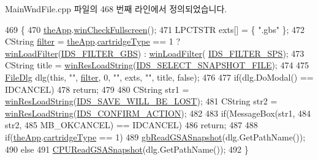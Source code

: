 Main\+Wnd\+File.\+cpp 파일의 468 번째 라인에서 정의되었습니다.


\begin{DoxyCode}
469 \{
470   \mbox{\hyperlink{_v_b_a_8cpp_a8095a9d06b37a7efe3723f3218ad8fb3}{theApp}}.\mbox{\hyperlink{class_v_b_a_a340eaeeb7fcfc242f08ac3442d991a96}{winCheckFullscreen}}();
471   LPCTSTR exts[] = \{ \textcolor{stringliteral}{".gbs"} \};
472   CString \mbox{\hyperlink{_s_d_l_8cpp_af0122ee4312107103b580a98c74a4ea6}{filter}} = \mbox{\hyperlink{_v_b_a_8cpp_a8095a9d06b37a7efe3723f3218ad8fb3}{theApp}}.\mbox{\hyperlink{class_v_b_a_af300759fcbc7eeb00ce73f956fc5ddb7}{cartridgeType}} == 1 ? 
      \mbox{\hyperlink{class_main_wnd_a7adc4aa2a10246fa13637e9d0870843d}{winLoadFilter}}(\mbox{\hyperlink{resource_8h_a55b32dff42e3aa47654c3f5197e11814}{IDS\_FILTER\_GBS}}) : \mbox{\hyperlink{class_main_wnd_a7adc4aa2a10246fa13637e9d0870843d}{winLoadFilter}}(
      \mbox{\hyperlink{resource_8h_a3509f1fb918cd687df0a40b31ea330fd}{IDS\_FILTER\_SPS}});
473   CString title = \mbox{\hyperlink{_win_res_util_8cpp_a416e85e80ab9b01376e87251c83d1a5a}{winResLoadString}}(\mbox{\hyperlink{resource_8h_ab4ce5e1027b17dec2f22647016aaa9fd}{IDS\_SELECT\_SNAPSHOT\_FILE}});
474 
475   \mbox{\hyperlink{class_file_dlg}{FileDlg}} dlg(\textcolor{keyword}{this}, \textcolor{stringliteral}{""}, \mbox{\hyperlink{_s_d_l_8cpp_af0122ee4312107103b580a98c74a4ea6}{filter}}, 0, \textcolor{stringliteral}{""}, exts, \textcolor{stringliteral}{""}, title, \textcolor{keyword}{false});
476   
477   \textcolor{keywordflow}{if}(dlg.DoModal() == IDCANCEL)
478     \textcolor{keywordflow}{return};
479 
480   CString str1 = \mbox{\hyperlink{_win_res_util_8cpp_a416e85e80ab9b01376e87251c83d1a5a}{winResLoadString}}(\mbox{\hyperlink{resource_8h_ac8fdd50f35135296f6c7d45a91751832}{IDS\_SAVE\_WILL\_BE\_LOST}});
481   CString str2 = \mbox{\hyperlink{_win_res_util_8cpp_a416e85e80ab9b01376e87251c83d1a5a}{winResLoadString}}(\mbox{\hyperlink{resource_8h_abc0b84029b8a14e65133a98d2b691eeb}{IDS\_CONFIRM\_ACTION}});
482 
483   \textcolor{keywordflow}{if}(MessageBox(str1,
484                 str2,
485                 MB\_OKCANCEL) == IDCANCEL)
486     \textcolor{keywordflow}{return};
487 
488   \textcolor{keywordflow}{if}(\mbox{\hyperlink{_v_b_a_8cpp_a8095a9d06b37a7efe3723f3218ad8fb3}{theApp}}.\mbox{\hyperlink{class_v_b_a_af300759fcbc7eeb00ce73f956fc5ddb7}{cartridgeType}} == 1)
489     \mbox{\hyperlink{_g_b_8cpp_aafea78cba80f883ee6f48e9fad826491}{gbReadGSASnapshot}}(dlg.GetPathName());
490   \textcolor{keywordflow}{else}
491     \mbox{\hyperlink{_g_b_a_8cpp_a25e768ca91f66c5d88ffe14f57a31caa}{CPUReadGSASnapshot}}(dlg.GetPathName());
492 \}
\end{DoxyCode}
